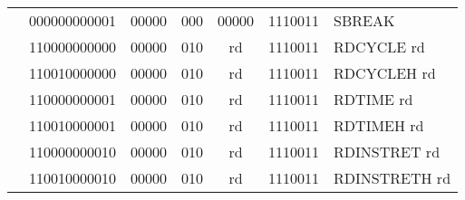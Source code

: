 \begin{table}[p]
\begin{small}
\begin{center}
\begin{tabular}{p{0in}p{0.4in}p{0.05in}p{0.05in}p{0.05in}p{0.05in}p{0.4in}p{0.6in}p{0.4in}p{0.6in}p{0.7in}l}
&
\multicolumn{6}{|c|}{000000000001} &
\multicolumn{1}{c|}{00000} &
\multicolumn{1}{c|}{000} &
\multicolumn{1}{c|}{00000} &
\multicolumn{1}{c|}{1110011} & SBREAK  \\
\cline{2-11}
  

&
\multicolumn{6}{|c|}{110000000000} &
\multicolumn{1}{c|}{00000} &
\multicolumn{1}{c|}{010} &
\multicolumn{1}{c|}{rd} &
\multicolumn{1}{c|}{1110011} & RDCYCLE rd \\
\cline{2-11}
  

&
\multicolumn{6}{|c|}{110010000000} &
\multicolumn{1}{c|}{00000} &
\multicolumn{1}{c|}{010} &
\multicolumn{1}{c|}{rd} &
\multicolumn{1}{c|}{1110011} & RDCYCLEH rd \\
\cline{2-11}
  

&
\multicolumn{6}{|c|}{110000000001} &
\multicolumn{1}{c|}{00000} &
\multicolumn{1}{c|}{010} &
\multicolumn{1}{c|}{rd} &
\multicolumn{1}{c|}{1110011} & RDTIME rd \\
\cline{2-11}
  

&
\multicolumn{6}{|c|}{110010000001} &
\multicolumn{1}{c|}{00000} &
\multicolumn{1}{c|}{010} &
\multicolumn{1}{c|}{rd} &
\multicolumn{1}{c|}{1110011} & RDTIMEH rd \\
\cline{2-11}
  

&
\multicolumn{6}{|c|}{110000000010} &
\multicolumn{1}{c|}{00000} &
\multicolumn{1}{c|}{010} &
\multicolumn{1}{c|}{rd} &
\multicolumn{1}{c|}{1110011} & RDINSTRET rd \\
\cline{2-11}
  

&
\multicolumn{6}{|c|}{110010000010} &
\multicolumn{1}{c|}{00000} &
\multicolumn{1}{c|}{010} &
\multicolumn{1}{c|}{rd} &
\multicolumn{1}{c|}{1110011} & RDINSTRETH rd \\
\cline{2-11}
  

\end{tabular}
\end{center}
\end{small}

\label{instr-table}
\end{table}
  

\newpage

